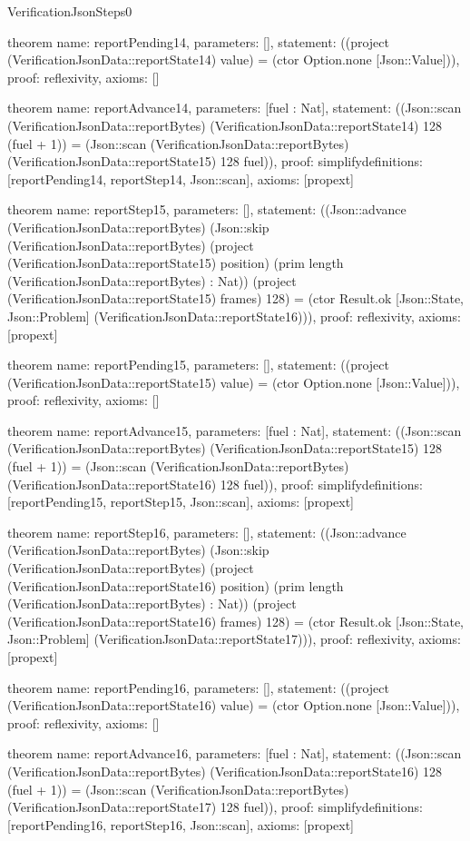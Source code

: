 \begin{lexlean}{VerificationJsonSteps0}
\begin{semanticmodule}
theorem{
  name: reportPending14,
  parameters: [],
  statement: ((project (VerificationJsonData::reportState14) value) = (ctor Option.none [Json::Value])),
  proof: reflexivity{},
  axioms: []
}

theorem{
  name: reportAdvance14,
  parameters: [fuel : Nat],
  statement: ((Json::scan (VerificationJsonData::reportBytes) (VerificationJsonData::reportState14) 128 (fuel + 1)) = (Json::scan (VerificationJsonData::reportBytes) (VerificationJsonData::reportState15) 128 fuel)),
  proof: simplify{definitions: [reportPending14, reportStep14, Json::scan]},
  axioms: [propext]
}

theorem{
  name: reportStep15,
  parameters: [],
  statement: ((Json::advance (VerificationJsonData::reportBytes) (Json::skip (VerificationJsonData::reportBytes) (project (VerificationJsonData::reportState15) position) (prim length (VerificationJsonData::reportBytes) : Nat)) (project (VerificationJsonData::reportState15) frames) 128) = (ctor Result.ok [Json::State, Json::Problem] (VerificationJsonData::reportState16))),
  proof: reflexivity{},
  axioms: [propext]
}

theorem{
  name: reportPending15,
  parameters: [],
  statement: ((project (VerificationJsonData::reportState15) value) = (ctor Option.none [Json::Value])),
  proof: reflexivity{},
  axioms: []
}

theorem{
  name: reportAdvance15,
  parameters: [fuel : Nat],
  statement: ((Json::scan (VerificationJsonData::reportBytes) (VerificationJsonData::reportState15) 128 (fuel + 1)) = (Json::scan (VerificationJsonData::reportBytes) (VerificationJsonData::reportState16) 128 fuel)),
  proof: simplify{definitions: [reportPending15, reportStep15, Json::scan]},
  axioms: [propext]
}

theorem{
  name: reportStep16,
  parameters: [],
  statement: ((Json::advance (VerificationJsonData::reportBytes) (Json::skip (VerificationJsonData::reportBytes) (project (VerificationJsonData::reportState16) position) (prim length (VerificationJsonData::reportBytes) : Nat)) (project (VerificationJsonData::reportState16) frames) 128) = (ctor Result.ok [Json::State, Json::Problem] (VerificationJsonData::reportState17))),
  proof: reflexivity{},
  axioms: [propext]
}

theorem{
  name: reportPending16,
  parameters: [],
  statement: ((project (VerificationJsonData::reportState16) value) = (ctor Option.none [Json::Value])),
  proof: reflexivity{},
  axioms: []
}

theorem{
  name: reportAdvance16,
  parameters: [fuel : Nat],
  statement: ((Json::scan (VerificationJsonData::reportBytes) (VerificationJsonData::reportState16) 128 (fuel + 1)) = (Json::scan (VerificationJsonData::reportBytes) (VerificationJsonData::reportState17) 128 fuel)),
  proof: simplify{definitions: [reportPending16, reportStep16, Json::scan]},
  axioms: [propext]
}


\end{semanticmodule}
\end{lexlean}
